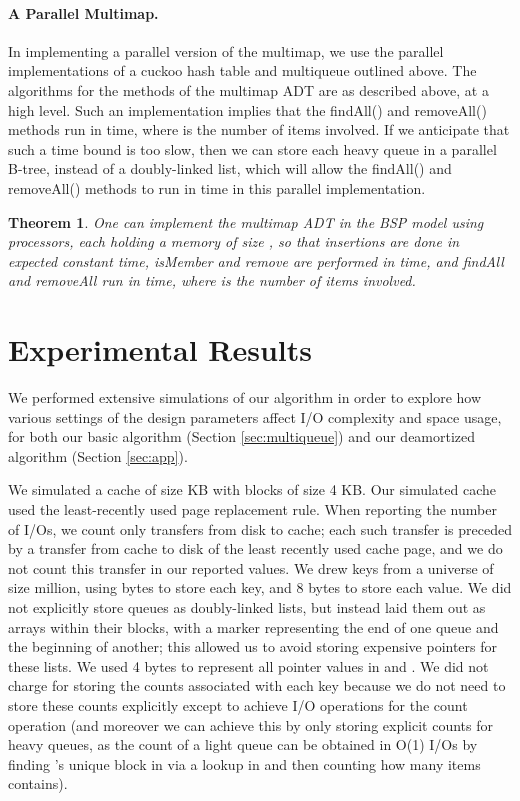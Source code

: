 \documentclass[11pt,letterpaper]{article}
\newtheorem{theorem}{Theorem}
\begin{document}
{\paragraph{A Parallel Multimap.}
In implementing a parallel version of the multimap, we use the
parallel implementations of a cuckoo hash table and multiqueue
outlined above.
The algorithms for the methods of the multimap ADT are as described
above, at a high level.
Such an implementation implies that the findAll() and
removeAll() methods run in  time,
where  is the number of items involved.
If we anticipate that such a time bound is too slow, then we can
store each heavy queue in a parallel B-tree, instead of a
doubly-linked list, which will allow the findAll() and
removeAll() methods to run in  time in this
parallel implementation.

\begin{theorem}
One can implement the multimap ADT in the BSP model using 
processors, each holding a memory of size , so that insertions
are done in expected constant time,
isMember and remove are performed in  time, and findAll and
removeAll run in  time, where  is the number of
items involved.
\end{theorem}
}


 \section{Experimental Results}
\label{sec:experiments}
We performed extensive simulations of our algorithm in order to explore how various settings of the design parameters affect I/O complexity and space usage, for both our basic algorithm (Section \ref{sec:multiqueue}) and our deamortized algorithm (Section \ref{sec:app}).

We simulated a cache of size  KB with blocks of size 4 KB. 
Our simulated cache used the least-recently used page replacement rule. 
When reporting the number of I/Os, we count only transfers from disk to cache; 
each such transfer is preceded by a transfer from cache to disk of the least recently used cache page, 
and we do not count this transfer in our reported values. We drew keys from a universe of size  million, 
using  bytes to store each key, and 8 bytes to store each value. We did not explicitly store queues as 
doubly-linked lists, but instead laid them out as arrays within their blocks, with a marker representing 
the end of one queue and the beginning of another; this allowed us to avoid storing expensive pointers for 
these lists. We used 4 bytes to represent all pointer values in  and . We did not 
charge for storing the counts associated with each key because we do not need to store these counts explicitly
except to achieve  I/O operations for the count operation (and moreover we can achieve 
this by only storing explicit counts for heavy queues, as the count of a light queue  can be 
obtained in O(1) I/Os by finding 's unique block in  via a lookup in  and then counting how many items  contains). 
\end{document}
